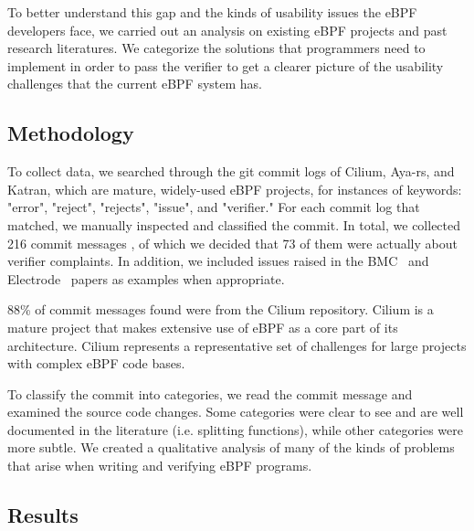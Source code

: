 To better understand this gap and the kinds of usability issues the eBPF
    developers face, we carried out an analysis on existing eBPF projects and
    past research literatures.
We categorize the solutions that programmers need to implement in order to pass the verifier to get a clearer picture of the usability challenges that the current eBPF system has.


\subsection{Methodology}
To collect data, we searched through the git commit logs of Cilium, Aya-rs, and
    Katran, which are mature, widely-used eBPF projects, for instances of
    keywords: "error", "reject", "rejects", "issue", and "verifier."
For each commit log that matched, we manually inspected and classified the commit.%
In total, we collected 216 commit messages , of which we decided that 73 of them were actually about verifier complaints.
In addition, we included  issues raised in the BMC~\cite{BMC} and Electrode~\cite{Electrode} papers as examples when appropriate.

88\% of commit messages found were from the Cilium repository.
Cilium is a mature project that makes extensive use of eBPF as a core part of its architecture.
Cilium represents a representative set of challenges for large projects with complex eBPF code bases.

To classify the commit into categories, we read the commit message and examined
    the source code changes.
Some categories were clear to see and are well documented in the literature (i.e. splitting functions), while other categories were more subtle.
We created a qualitative analysis of many of the kinds of problems that arise when writing and verifying eBPF programs.

\subsection{Results}

